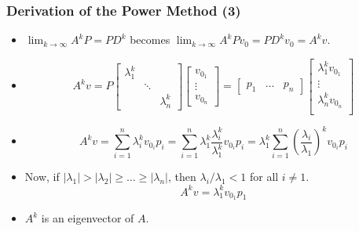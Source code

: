 \documentclass{beamer}
\begin{document}
\begin{frame}
	\frametitle{Derivation of the Power Method (3)}
	\begin{itemize}
		\item<1-> $\displaystyle \lim_{k\to\infty}A^kP=PD^k$ becomes $\displaystyle \lim_{k\to\infty}A^kPv_0=PD^kv_0=A^kv$.
		\item<2->[]
		\begin{equation*}
			A^k v 
			= P \begin{bmatrix}
				\lambda_1^k & & \\
				& \ddots & \\
				& & \lambda_n^k
			\end{bmatrix}
			\begin{bmatrix}
				v_{0_1} \\ \vdots \\ v_{0_n}
			\end{bmatrix}
			=\begin{bmatrix}
				p_1 & \ldots & p_n
			\end{bmatrix} \begin{bmatrix}
				\lambda_1^k v_{0_1} \\ 
				\vdots \\
				\lambda_n^k v_{0_n} \\ 
			\end{bmatrix}
		\end{equation*}

		\item<3->[]
		\begin{equation*}
			A^kv=\sum_{i=1}^{n}\lambda_i^k v_{0_i} p_i
			=\sum_{i=1}^{n}\lambda_1^k\frac{\lambda_i^k}{\lambda_1^k} v_{0_i} p_i
			=\lambda_1^k \sum_{i=1}^{n}\left(\frac{\lambda_i}{\lambda_1}\right)^k v_{0_i}p_i
		\end{equation*}
	
		\item<4->
		Now, if $\left|\lambda_1\right|>\left|\lambda_2\right|\geq\ldots\geq \left|\lambda_n\right|$, then $\lambda_i/\lambda_1<1$ for all $i\neq 1$.
		\begin{equation*}
		    A^kv=\lambda_1^k v_{0_1}p_1
		\end{equation*}

		\item<5-> $A^k$ is an eigenvector of $A$.
	\end{itemize}
\end{frame}
\end{document}
